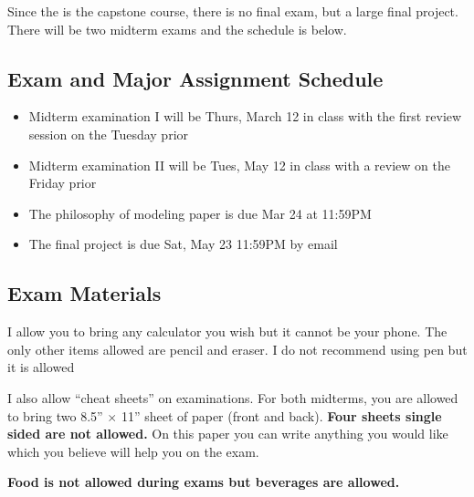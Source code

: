 \documentclass[12pt]{article}
\newcommand{\inred}[1]{\color{red}\textbf{#1} \color{black}}
\newcommand{\qu}[1]{``#1''}
\begin{document}
Since the is the capstone course, there is no final exam, but a large final project. There will be two midterm exams and the schedule is below.

\subsection*{Exam and Major Assignment Schedule}\label{subsec:exam_schedule}

\begin{itemize}
\itemsep -0.0em 
\item Midterm examination I will be Thurs, March 12 in class with the first review session on the Tuesday prior
\item Midterm examination II will be Tues, May 12 in class with a review on the Friday prior
\item The philosophy of modeling paper is due Mar 24 at 11:59PM
\item The final project is due Sat, May 23 11:59PM by email
\end{itemize}

\subsection*{Exam Materials}

I allow you to bring any calculator you wish but it cannot be your phone. The only other items allowed are pencil and eraser. I do not recommend using pen but it is allowed

I also allow \qu{cheat sheets} on examinations. For both midterms, you are allowed to bring two 8.5'' $\times$ 11'' sheet of paper (front and back). \inred{Four sheets single sided are not allowed.} On this paper you can write anything you would like which you believe will help you on the exam. %

\inred{Food is not allowed during exams but beverages are allowed.}

%
%
\end{document}
